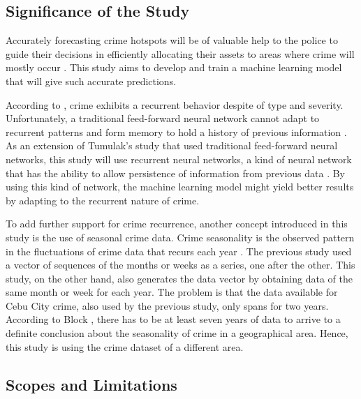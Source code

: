 \subsection{Significance of the Study}

    Accurately forecasting crime hotspots will be of valuable help to the police to guide their decisions in efficiently allocating their assets to areas where crime will mostly occur \cite{eck2005mapping}. This study aims to develop and train a machine learning model that will give such accurate predictions.

    According to \cite{perc2013understanding}, crime exhibits a recurrent behavior despite of type and severity. Unfortunately, a traditional feed-forward neural network cannot adapt to recurrent patterns and form memory to hold a history of previous information \cite{mikolov2010recurrent}. As an extension of Tumulak's study \cite{tumulak2015crime} that used traditional feed-forward neural networks, this study will use recurrent neural networks, a kind of neural network that has the ability to allow persistence of information from previous data \cite{graves2012supervised}. By using this kind of network, the machine learning model might yield better results by adapting to the recurrent nature of crime.

    To add further support for crime recurrence, another concept introduced in this study is the use of seasonal crime data. Crime seasonality is the observed pattern in the fluctuations of crime data that recurs each year \cite{lauritsen2014seasonal}. The previous study used a vector of sequences of the months or weeks as a series, one after the other. This study, on the other hand, also generates the data vector by obtaining data of the same month or week for each year. The problem is that the data available for Cebu City crime, also used by the previous study, only spans for two years. According to Block \cite{block1984crime}, there has to be at least seven years of data to arrive to a definite conclusion about the seasonality of crime in a geographical area. Hence, this study is using the crime dataset of a different area.

\subsection{Scopes and Limitations}

